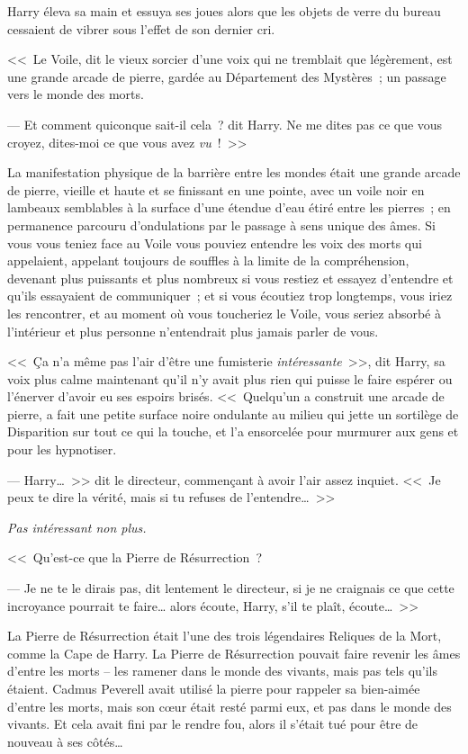 Harry éleva sa main et essuya ses joues alors que les objets de verre du bureau cessaient de vibrer sous l'effet de son dernier cri.

<<~Le Voile, dit le vieux sorcier d'une voix qui ne tremblait que légèrement, est une grande arcade de pierre, gardée au Département des Mystères~; un passage vers le monde des morts.

--- Et comment quiconque sait-il cela~? dit Harry. Ne me dites pas ce que vous croyez, dites-moi ce que vous avez \emph{vu}~!~>>

La manifestation physique de la barrière entre les mondes était une grande arcade de pierre, vieille et haute et se finissant en une pointe, avec un voile noir en lambeaux semblables à la surface d'une étendue d'eau étiré entre les pierres~; en permanence parcouru d'ondulations par le passage à sens unique des âmes. Si vous vous teniez face au Voile vous pouviez entendre les voix des morts qui appelaient, appelant toujours de souffles à la limite de la compréhension, devenant plus puissants et plus nombreux si vous restiez et essayez d'entendre et qu'ils essayaient de communiquer~; et si vous écoutiez trop longtemps, vous iriez les rencontrer, et au moment où vous toucheriez le Voile, vous seriez absorbé à l'intérieur et plus personne n'entendrait plus jamais parler de vous.

<<~Ça n'a même pas l'air d'être une fumisterie \emph{intéressante}~>>, dit Harry, sa voix plus calme maintenant qu'il n'y avait plus rien qui puisse le faire espérer ou l'énerver d'avoir eu ses espoirs brisés. <<~Quelqu'un a construit une arcade de pierre, a fait une petite surface noire ondulante au milieu qui jette un sortilège de Disparition sur tout ce qui la touche, et l'a ensorcelée pour murmurer aux gens et pour les hypnotiser.

--- Harry…~>> dit le directeur, commençant à avoir l'air assez inquiet. <<~Je peux te dire la vérité, mais si tu refuses de l'entendre…~>>

\emph{Pas intéressant non plus.}

<<~Qu'est-ce que la Pierre de Résurrection~?

--- Je ne te le dirais pas, dit lentement le directeur, si je ne craignais ce que cette incroyance pourrait te faire… alors écoute, Harry, s'il te plaît, écoute…~>>

La Pierre de Résurrection était l'une des trois légendaires Reliques de la Mort, comme la Cape de Harry. La Pierre de Résurrection pouvait faire revenir les âmes d'entre les morts -- les ramener dans le monde des vivants, mais pas tels qu'ils étaient. Cadmus Peverell avait utilisé la pierre pour rappeler sa bien-aimée d'entre les morts, mais son cœur était resté parmi eux, et pas dans le monde des vivants. Et cela avait fini par le rendre fou, alors il s'était tué pour être de nouveau à ses côtés…

